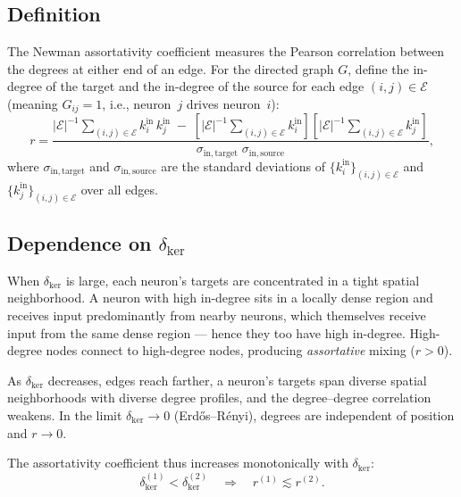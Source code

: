 \documentclass[11pt]{article}
\begin{document}
\subsection{Definition}

The Newman assortativity coefficient measures the Pearson correlation
between the degrees at either end of an edge.  For the directed graph
$G$, define the in-degree of the target and the in-degree of the
source for each edge $(i,j)\in\mathcal{E}$ (meaning $G_{ij}=1$,
i.e., neuron~$j$ drives neuron~$i$):
\begin{equation}
  r = \frac{
    |\mathcal{E}|^{-1}\!\displaystyle\sum_{(i,j)\in\mathcal{E}}
    k_i^{\mathrm{in}}\,k_j^{\mathrm{in}}
    \;-\;
    \left[|\mathcal{E}|^{-1}\!\displaystyle\sum_{(i,j)\in\mathcal{E}}
    k_i^{\mathrm{in}}\right]
    \left[|\mathcal{E}|^{-1}\!\displaystyle\sum_{(i,j)\in\mathcal{E}}
    k_j^{\mathrm{in}}\right]
  }{
    \sigma_{\mathrm{in,target}}\;\sigma_{\mathrm{in,source}}
  },
  \label{eq:assortativity}
\end{equation}
where $\sigma_{\mathrm{in,target}}$ and $\sigma_{\mathrm{in,source}}$ are the
standard deviations of $\{k_i^{\mathrm{in}}\}_{(i,j)\in\mathcal{E}}$
and $\{k_j^{\mathrm{in}}\}_{(i,j)\in\mathcal{E}}$ over all edges.

\subsection{Dependence on $\delta_{\mathrm{ker}}$}

When $\delta_{\mathrm{ker}}$ is large, each neuron's targets are
concentrated in a tight spatial neighborhood.  A neuron with high
in-degree sits in a locally dense region and receives input
predominantly from nearby neurons, which themselves receive input from
the same dense region --- hence they too have high in-degree.
High-degree nodes connect to high-degree nodes, producing
\emph{assortative} mixing ($r>0$).

As $\delta_{\mathrm{ker}}$ decreases, edges reach farther, a neuron's
targets span diverse spatial neighborhoods with diverse degree
profiles, and the degree--degree correlation weakens.  In the limit
$\delta_{\mathrm{ker}}\to 0$ (Erd\H{o}s--R\'enyi), degrees are
independent of position and $r\to 0$.

The assortativity coefficient thus increases monotonically with
$\delta_{\mathrm{ker}}$:
\begin{equation}
  \delta_{\mathrm{ker}}^{(1)} < \delta_{\mathrm{ker}}^{(2)}
  \quad\Longrightarrow\quad
  r^{(1)} \lesssim r^{(2)}.
  \label{eq:r_monotone}
\end{equation}
\end{document}
